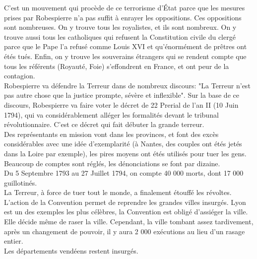 \documentclass[10pt, a4paper, openany]{book}
\begin{document}
C'est un mouvement qui procède de ce terrorisme d'État parce que les mesures prises par Robespierre n'a pas suffit à enrayer les oppositions. Ces oppositions sont nombreuses. On y trouve tous les royalistes, et ils sont nombreux. On y trouve aussi tous les catholiques qui refusent la Constitution civile du clergé parce que le Pape l'a refusé comme Louis XVI et qu'énormément de prêtres ont étés tués. Enfin, on y trouve les souverains étrangers qui se rendent compte que tous les référents (Royauté, Foie) s'effondrent en France, et ont peur de la contagion. \\
Robespierre va défendre la Terreur dans de nombreux discours: "La Terreur n'est pas autre chose que la justice prompte, sévère et inflexible". Sur la base de ce discours, Robespierre va faire voter le décret de 22 Prerial de l'an II (10 Juin 1794), qui va considérablement alléger les formalités devant le tribunal révolutionnaire. C'est ce décret qui fait débuter la grande terreur. \\
Des représentants en mission vont dans les provinces, et font des excès considérables avec une idée d'exemplarité (à Nantes, des couples ont étés jetés dans la Loire par exemple), les pires moyens ont étés utilisés pour tuer les gens. Beaucoup de comptes sont réglés, les dénonciations se font par dizaine. \\
Du 5 Septembre 1793 au 27 Juillet 1794, on compte 40 000 morts, dont 17 000 guillotinés. \\
La Terreur, à force de tuer tout le monde, a finalement étouffé les révoltes. L'action de la Convention permet de reprendre les grandes villes insurgés. Lyon est un des exemples les plus célèbres, la Convention est obligé d'assiéger la ville. Elle décide même de raser la ville. Cependant, la ville tombant assez tardivement, après un changement de pouvoir, il y aura 2 000 exécutions au lieu d'un rasage entier. \\
Les départements vendéens restent insurgés. 
\end{document}
